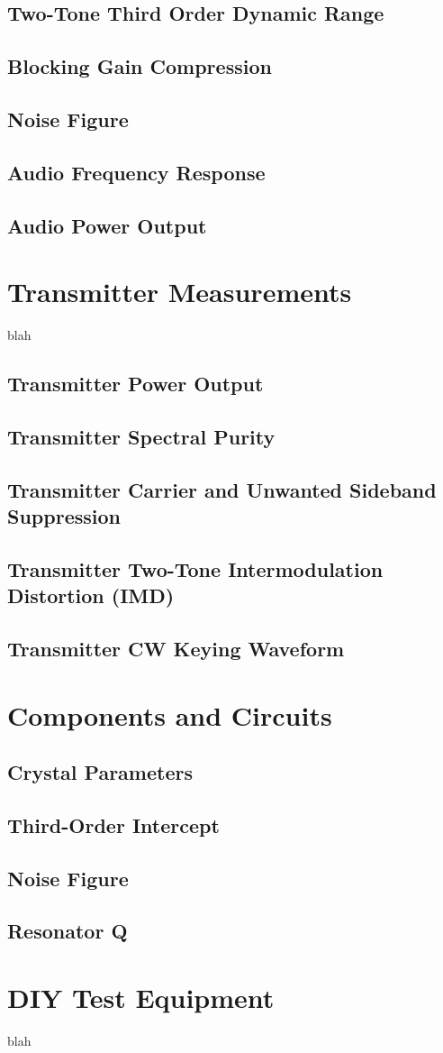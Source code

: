 \documentclass[10pt,letterpaper]{book}
\begin{document}
\section{Two-Tone Third Order Dynamic Range}
\section{Blocking Gain Compression}
\section{Noise Figure}
\section{Audio Frequency Response}
\section{Audio Power Output}

\chapter{Transmitter Measurements}
blah
\section{Transmitter Power Output}
\section{Transmitter Spectral Purity}
\section{Transmitter Carrier and Unwanted Sideband Suppression}
\section{Transmitter Two-Tone Intermodulation Distortion (IMD)}
\section{Transmitter CW Keying Waveform}
\chapter{Components and Circuits}
\section{Crystal Parameters}
\section{Third-Order Intercept}
\section{Noise Figure}
\section{Resonator Q}
\chapter{DIY Test Equipment}
blah
\end{document}
